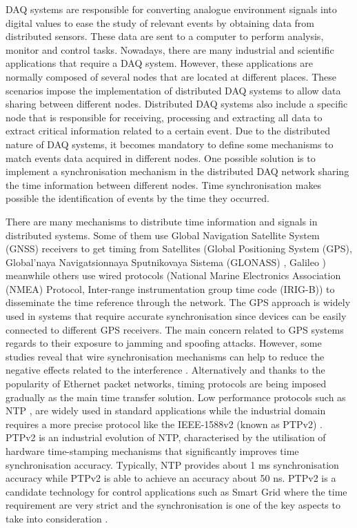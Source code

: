DAQ \cite{daq:book1} systems are responsible for converting analogue environment signals into digital values to ease the study of relevant events by obtaining data from distributed sensors. These data are sent to a computer to perform analysis, monitor and control tasks. Nowadays, there are many industrial \cite{daq:res} and scientific applications \cite{daq:sensor-networks} that require a DAQ system. However, these applications are normally composed of several nodes that are located at different places.
These scenarios impose the implementation of distributed DAQ systems to allow data sharing between different nodes. Distributed DAQ systems also include a specific node that is responsible for receiving, processing and extracting all data to extract critical information related to a certain event. Due to the distributed nature of DAQ systems, it becomes mandatory to define some mechanisms to match events data acquired in different nodes. One possible solution is to implement a synchronisation mechanism in the distributed DAQ network sharing the time information between different nodes. Time synchronisation makes possible the identification of events by the time they occurred.

There are many mechanisms to distribute time information and signals in distributed systems. Some of them use Global Navigation Satellite System (GNSS) receivers to get timing from Satellites (Global Positioning System (GPS), Global'naya Navigatsionnaya Sputnikovaya Sistema (GLONASS)  \cite{glonass:website}, Galileo \cite{gsa:galileo}) meanwhile others use wired protocols (National Marine Electronics Association (NMEA) Protocol, Inter-range instrumentation group time code (IRIG-B)) to disseminate the time reference through the network. The GPS approach is widely used in systems that require accurate synchronisation since devices can be easily connected to different GPS receivers. The main concern related to GPS systems regards to their exposure to jamming and spoofing attacks. However, some studies reveal that wire synchronisation mechanisms can help to reduce the negative effects related to the interference \cite{NOURA2016130}. Alternatively and thanks to the popularity of Ethernet packet networks, timing protocols are being imposed gradually as the main time transfer solution. Low performance protocols such as NTP \cite{ntf:ntp_std}, are widely used in standard applications while the industrial domain requires a more precise protocol like the IEEE-1588v2 (known as PTPv2) \cite{ieee:ieee1588_std} \cite{itu:TG8275_1_Y_1369_1}. PTPv2 is an industrial evolution of NTP, characterised by the utilisation of hardware time-stamping mechanisms that significantly improves time synchronisation accuracy. Typically, NTP provides about 1 ms synchronisation accuracy while PTPv2 is able to achieve an accuracy about 50 ns. PTPv2 is a candidate technology for control applications such as Smart Grid where the time requirement are very strict and the synchronisation is one of the key aspects to take into consideration \cite{NAFI201623} \cite{COLAK2016396}.

